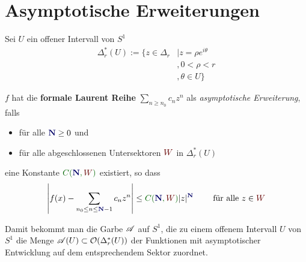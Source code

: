 \section{Asymptotische Erweiterungen} %
\begin{comment}
  See \cite{van2003galois}
\end{comment}
\begin{paracol}{2}
\begin{defn} Sei \textcolor{red!60!black}{$U$} ein offener Intervall von $S^1$
  \begin{align*}
    \Delta_r^*(U):= \{z\in\Delta_r&\mid z=\rho e^{i\theta}
                                \\&,0<\rho<r
                                \\&,\theta\in U\}
  \end{align*}
\end{defn}
\switchcolumn
\end{paracol}
\begin{defn}
  \def\myN{\textbf{\textcolor{blue!40!black}{N}}}
  \def\mySect{\textcolor{red!40!black}{W}}
  \def\myConst{\textcolor{green!40!black}{C(\myN,\mySect)}}
  $f$ hat die \textbf{formale Laurent Reihe} $\sum_{n\geq n_0}c_nz^n$ als
  \emph{asymptotische Erweiterung}, falls
  \begin{itemize}
    \item für alle $\myN\geq0$ und
    \item für alle abgeschlossenen Untersektoren $\mySect$ in $\Delta_r^*(U)$
  \end{itemize}
  eine Konstante $\myConst$ existiert, so dass
  \[
    \left|
      f(x)-\sum_{n_0\leq n\leq \myN-1}c_nz^n
    \right|
    \leq \myConst|z|^{\myN} \qquad \text{ für alle } z\in \mySect
  \]
  \begin{comment}
    \Leftrightarrow{}
    \[
      \lim_{z\to0,z\in{\mySect}}
      |z|^{-(\myN-1)}
      \left|
      f(x)-\sum_{n_0\leq n\leq \myN-1}c_nz^n
      \right|=0
      \qquad \text{ für alle } z\in \mySect
    \]
  \end{comment}
  Damit bekommt man die Garbe $\mathscr{A}$ auf $S^1$, die zu einem offenem Intervall
  $U$ von $S^1$ die Menge $\mathscr{A}(U)\subset\mathcal{O}(\Delta_r^*(U))$ der Funktionen mit
  asymptotischer Entwicklung auf dem entsprechendem Sektor zuordnet.
\end{defn}


